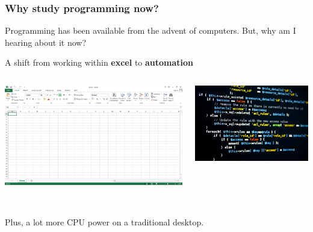 \documentclass{beamer}\usepackage[]{graphicx}\usepackage[]{color}
\begin{document}
\begin{frame}
\frametitle{Why study programming now?}
Programming has been available from the advent of computers. But, why am I hearing about it now?

\flushleft

A shift from working within \textbf{excel} to \textbf{automation} \\

  \begin{columns}
    \begin{column}{.5\linewidth}
    \begin{center}
    \includegraphics[scale=.15]{excel.png}
    \end{center}
    \end{column}
    \begin{column}{.5\linewidth}
    \begin{center}
    \includegraphics[scale=.2]{phpCode.png}
    \end{center}
    \end{column}
  \end{columns}
$ $ \\
Plus, a lot more CPU power on a traditional desktop.
\end{frame}
\end{document}
